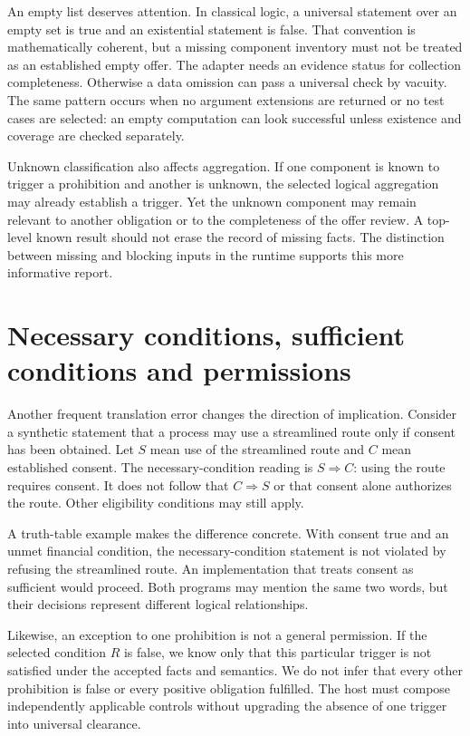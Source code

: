 \documentclass[12pt,a4paper,oneside,openany]{book}
\begin{document}
An empty list deserves attention. In classical logic, a universal statement over
an empty set is true and an existential statement is false. That convention is
mathematically coherent, but a missing component inventory must not be treated as
an established empty offer. The adapter needs an evidence status for collection
completeness. Otherwise a data omission can pass a universal check by vacuity.
The same pattern occurs when no argument extensions are returned or no test cases
are selected: an empty computation can look successful unless existence and
coverage are checked separately.

Unknown classification also affects aggregation. If one component is known to
trigger a prohibition and another is unknown, the selected logical aggregation
may already establish a trigger. Yet the unknown component may remain relevant
to another obligation or to the completeness of the offer review. A top-level
known result should not erase the record of missing facts. The distinction between
missing and blocking inputs in the runtime supports this more informative report.

\section{Necessary conditions, sufficient conditions and permissions}
\label{merge:M03:02}


Another frequent translation error changes the direction of implication. Consider
a synthetic statement that a process may use a streamlined route only if consent
has been obtained. Let $S$ mean use of the streamlined route and $C$ mean established
consent. The necessary-condition reading is $S\Rightarrow C$: using the route
requires consent. It does not follow that $C\Rightarrow S$ or that consent alone
authorizes the route. Other eligibility conditions may still apply.

A truth-table example makes the difference concrete. With consent true and an
unmet financial condition, the necessary-condition statement is not violated by
refusing the streamlined route. An implementation that treats consent as sufficient
would proceed. Both programs may mention the same two words, but their decisions
represent different logical relationships.

Likewise, an exception to one prohibition is not a general permission. If the
selected condition $R$ is false, we know only that this particular trigger is not
satisfied under the accepted facts and semantics. We do not infer that every
other prohibition is false or every positive obligation fulfilled. The host must
compose independently applicable controls without upgrading the absence of one
trigger into universal clearance.
\end{document}
